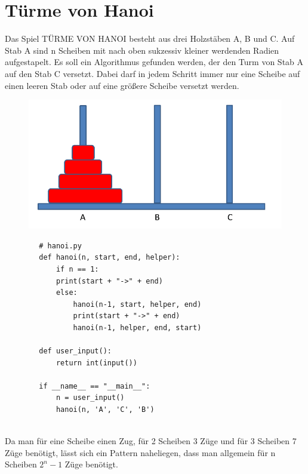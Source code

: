 \documentclass[11pt]{article}
\begin{document}
\section{}
 
	\section*{Türme von Hanoi} 
\textmd{   
	Das Spiel TÜRME VON HANOI besteht aus drei Holzstäben A, B und C. Auf Stab A sind n Scheiben
	mit nach oben sukzessiv kleiner werdenden Radien aufgestapelt. Es soll ein Algorithmus gefunden
	werden, der den Turm von Stab A auf den Stab C versetzt. Dabei darf in jedem Schritt immer nur
	eine Scheibe auf einen leeren Stab oder auf eine größere Scheibe versetzt werden.
}
	\begin{figure} [h]
		\centering
		\includegraphics[width=12cm]{aufgabe-hanoi.png}
	\end{figure}
	\vspace{-20pt}
	\begin{lstlisting}
		# hanoi.py
		def hanoi(n, start, end, helper): 
			if n == 1:
			print(start + "->" + end)  
			else:
				hanoi(n-1, start, helper, end)
				print(start + "->" + end)
				hanoi(n-1, helper, end, start)
		
		def user_input():
			return int(input())
		
		if __name__ == "__main__": 
			n = user_input()
			hanoi(n, 'A', 'C', 'B') 
	\end{lstlisting}
\\
\textmd{
Da man für eine Scheibe einen Zug, für 2 Scheiben 3 Züge und für 3 Scheiben 7 Züge benötigt, 
lässt sich ein Pattern naheliegen, dass man allgemein für n Scheiben $2^n - 1$ Züge benötigt. 
}
\end{document}
